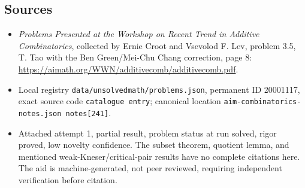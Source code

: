 \documentclass[11pt]{article}
\begin{document}
\subsection{Sources}
\begin{itemize}
\item \emph{Problems Presented at the Workshop on Recent Trend in Additive Combinatorics}, collected by Ernie Croot and Vsevolod F. Lev, problem 3.5, T. Tao with the Ben Green/Mei-Chu Chang correction, page 8: \url{https://aimath.org/WWN/additivecomb/additivecomb.pdf}.
\item Local registry \texttt{data/unsolvedmath/problems.json}, permanent ID 20001117, exact source code \texttt{catalogue entry}; canonical location \texttt{aim-combinatorics-notes.json notes[241]}.
\item Attached attempt 1, partial result, problem status at run solved, rigor proved, low novelty confidence. The subset theorem, quotient lemma, and mentioned weak-Kneser/critical-pair results have no complete citations here. The aid is machine-generated, not peer reviewed, requiring independent verification before citation.
\end{itemize}
\end{document}
